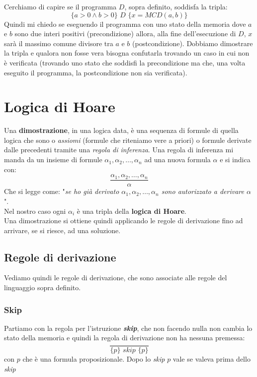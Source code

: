\documentclass[a4paper,12pt, oneside]{book}
\begin{document}
Cerchiamo di capire se il programma $D$, sopra definito, soddisfa la tripla:
\[\{a>0\land b>0\}\,\,D\,\, \{x=MCD(a,b)\}\]
Quindi mi chiedo se eseguendo il programma con uno stato della memoria dove $a$
e $b$ sono due interi positivi (precondizione) allora, alla fine dell'esecuzione
di $D$, $x$ sarà il massimo comune divisore tra $a$ e $b$
(postcondizione). Dobbiamo dimostrare la tripla e qualora non fosse vera bisogna
confutarla trovando un caso in cui non è verificata (trovando uno stato che
soddisfi la precondizione ma che, una volta eseguito il programma, la postcondizione non 
sia verificata).
\section{Logica di Hoare}
\begin{definizione}
  Una \textbf{dimostrazione}, in una logica data, è una sequenza di formule di
  quella logica che sono o \textit{assiomi} (formule che riteniamo vere a
  priori) o formule derivate dalle precedenti tramite una \textit{regola di
    inferenza}. Una regola di inferenza mi manda da un insieme di formule
  $\alpha_1,\alpha_2,\ldots,\alpha_n$ ad una nuova formula $\alpha$ e si indica
  con: 
  \[\frac{\alpha_1,\alpha_2,\ldots,\alpha_n}{\alpha}\]
  Che si legge come: "\textit{se ho già derivato $\alpha_1, \alpha_2,
    \ldots,\alpha_n$ sono autorizzato a derivare $\alpha$}".\\ 
  Nel nostro caso ogni $\alpha_i$ è una tripla della \textbf{logica di Hoare}.\\
  Una dimostrazione si ottiene quindi applicando le regole di derivazione fino
  ad arrivare, se si riesce, ad una soluzione.
\end{definizione}
\subsection{Regole di derivazione}
Vediamo quindi le regole di derivazione, che sono associate alle regole del
linguaggio sopra definito.
\subsubsection{Skip}
\begin{definizione}
  Partiamo con la regola per l'istruzione \textbf{\textit{skip}}, che non
  facendo nulla 
  non cambia lo stato della memoria e quindi la regola di derivazione non ha
  nessuna premessa:
  \[\frac{}{\{p\}\,\,skip\,\,\{p\}}\]
  con $p$ che è una formula proposizionale. Dopo lo \textit{skip} $p$ vale se
  valeva prima dello \textit{skip}
\end{definizione}
\end{document}
